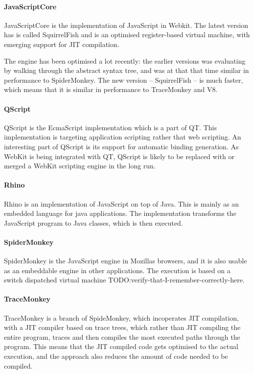 \documentclass[11pt]{report}
\begin{document}
\paragraph{JavaScriptCore} 
JavaScriptCore is the implementation of JavaScript in Webkit.
The latest version has is called SquirrelFish and is an optimised register-based virtual machine,
with emerging support for JIT compilation.

The engine has been optimised a lot recently: the earlier versions was evaluating by walking through the abstract syntax tree, and was at that that time similar in performance to SpiderMonkey.
The new version -- SquirrelFish -- is much faster, which means that it is similar in performance to TraceMonkey and V8.

\paragraph{QScript}
QScript is the EcmaScript implementation which is a part of QT. This implementation is targeting application scripting rather that web scripting. An interesting part of QScript is its support for automatic binding generation. As WebKit is being integrated with QT, QScript is likely to be replaced with or merged a WebKit scripting engine in the long run.

\paragraph{Rhino}
Rhino is an implementation of JavaScript on top of Java. This is mainly as an embedded language for java applications. The implementation transforms the JavaScript program to Java classes, which is then executed.

\paragraph{SpiderMonkey}
\label{spidermonkey}
SpiderMonkey \cite{spidermonkey} is the JavaScript engine in Mozillas browsers, and it is also usable as an embeddable engine in other applications. The execution is based on a switch dispatched virtual machine TODO:verify-that-I-remember-correctly-here.

\paragraph{TraceMonkey} 
TraceMonkey is a branch of SpideMonkey, which incoperates JIT compilation, with a JIT compiler based on trace trees\cite{trace-tree}, 
which rather than JIT compiling the entire program,
traces and then compiles the most executed paths through the program.
This means that the JIT compiled code gets optimised to the actual execution,
and the approach also reduces the amount of code needed to be compiled.
\end{document}
